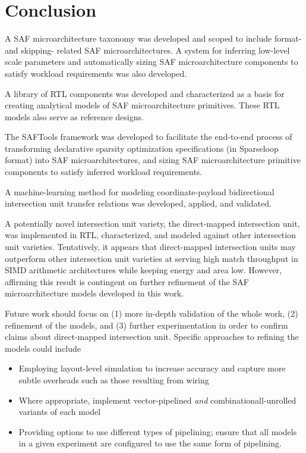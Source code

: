 \chapter{Conclusion}
\label{chapter:conclusion}

A SAF microarchitecture taxonomy was developed and scoped to include format- and skipping- related SAF microarchitectures. A system for inferring low-level scale parameters and automatically sizing SAF microarchitecture components to satisfy workload requirements was also developed.

A library of RTL components was developed and characterized as a basis for creating analytical models of SAF microarchitecture primitives. These RTL models also serve as reference designs.

The SAFTools framework was developed to facilitate the end-to-end process of transforming declarative sparsity optimization specifications (in Sparseloop\cite{sparseloop} format) into SAF microarchitectures, and sizing SAF microarchitecture primitive components to satisfy inferred workload requirements.

A machine-learning method for modeling coordinate-payload bidirectional intersection unit transfer relations was developed, applied, and validated.

A potentially novel intersection unit variety, the direct-mapped intersection unit, was implemented in RTL, characterized, and modeled against other intersection unit varieties. Tentatively, it appears that direct-mapped intersection units may outperform other intersection unit varieties at serving high match throughput in SIMD arithmetic architectures while keeping energy and area low. However, affirming this result is contingent on further refinement of the SAF microarchitecture models developed in this work.

Future work should focus on (1) more in-depth validation of the whole work, (2) refinement of the models, and (3) further experimentation in order to confirm claims about direct-mapped intersection unit. Specific approaches to refining the models could include

\begin{itemize}
    \item Employing layout-level simulation to increase accuracy and capture more subtle overheads such as those resulting from wiring
    \item Where appropriate, implement vector-pipelined \textit{and} combinationall-unrolled variants of each model
    \item Providing options to use different types of pipelining; ensure that all models in a given experiment are configured to use the same form of pipelining.
\end{itemize}

